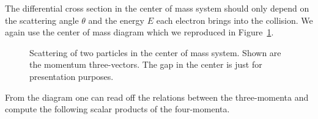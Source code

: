 \documentclass[11pt, english, fleqn, DIV=15, headinclude, BCOR=1cm]{scrartcl}
\begin{document}
The differential cross section in the center of mass system should only depend
on the scattering angle $\theta$ and the energy $E$ each electron brings into
the collision. We again use the center of mass diagram which we reproduced in
Figure~\ref{fig:center_of_mass}.

\begin{figure}[hbp]
    \centering
    \caption{%
        Scattering of two particles in the center of mass system. Shown are the
        momentum three-vectors. The gap in the center is just for presentation
        purposes.
    }
    \label{fig:center_of_mass}
\end{figure}

From the diagram one can read off the relations between the three-momenta and
compute the following scalar products of the four-momenta.
\end{document}
